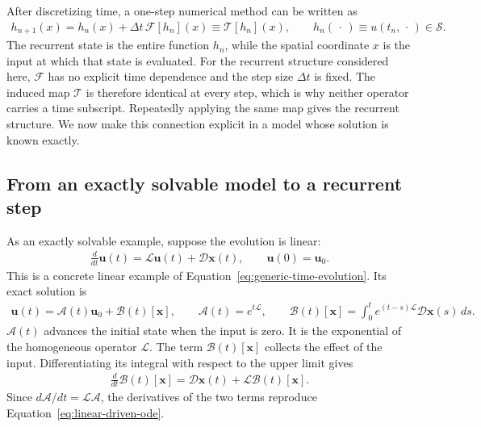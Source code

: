 \documentclass[11pt]{article}
\begin{document}
After discretizing time, a one-step numerical method can be written as
\begin{equation}
  \begin{split}
  h_{n+1}(x)
  =h_n(x)+\Delta t\,\mathcal F[h_n](x)
  \equiv\mathcal T[h_n](x),
  \qquad
  h_n(\,\cdot\,)\equiv u(t_n,\,\cdot\,)\in\mathcal S.
  \label{eq:function-state-step}
  \end{split}
\end{equation}
The recurrent state is the entire function $h_n$, while the spatial coordinate
$x$ is the input at which that state is evaluated.  For the recurrent structure
considered here, $\mathcal F$ has no explicit time dependence and the step size
$\Delta t$ is fixed.  The induced map $\mathcal T$ is therefore identical at
every step, which is why neither operator carries a time subscript.  Repeatedly
applying the same map gives the recurrent structure.  We now make this
connection explicit in a model whose solution is known exactly.

\subsection{From an exactly solvable model to a recurrent step}

As an exactly solvable example, suppose the evolution is linear:
\begin{equation}
  \begin{split}
  \frac{d}{dt}\bm{u}(t)
  =\mathcal L\bm{u}(t)+\mathcal D\bm{x}(t),
  \qquad
  \bm{u}(0)=\bm{u}_0.
  \label{eq:linear-driven-ode}
  \end{split}
\end{equation}
This is a concrete linear example of
Equation~\eqref{eq:generic-time-evolution}.  Its exact solution is
\begin{equation}
  \begin{split}
  \bm{u}(t)
  =\mathcal A(t)\bm{u}_0+\mathcal B(t)[\bm{x}],
  \qquad
  \mathcal A(t)=e^{t\mathcal L},
  \qquad
  \mathcal B(t)[\bm{x}]
  =\int_0^t e^{(t-s)\mathcal L}\mathcal D\bm{x}(s)\,ds.
  \label{eq:linear-ode-solution}
  \end{split}
\end{equation}
$\mathcal A(t)$ advances the initial state when the input is zero.  It is the
exponential of the homogeneous operator $\mathcal L$.  The term
$\mathcal B(t)[\bm x]$ collects the effect of the input.  Differentiating its
integral with respect to the upper limit gives
\begin{equation}
  \begin{split}
  \frac{d}{dt}\mathcal B(t)[\bm{x}]
  =\mathcal D\bm{x}(t)+\mathcal L\mathcal B(t)[\bm{x}].
  \label{eq:forcing-integral-derivative}
  \end{split}
\end{equation}
Since $d\mathcal A/dt=\mathcal L\mathcal A$, the derivatives of the two terms
reproduce Equation~\eqref{eq:linear-driven-ode}.
\end{document}
